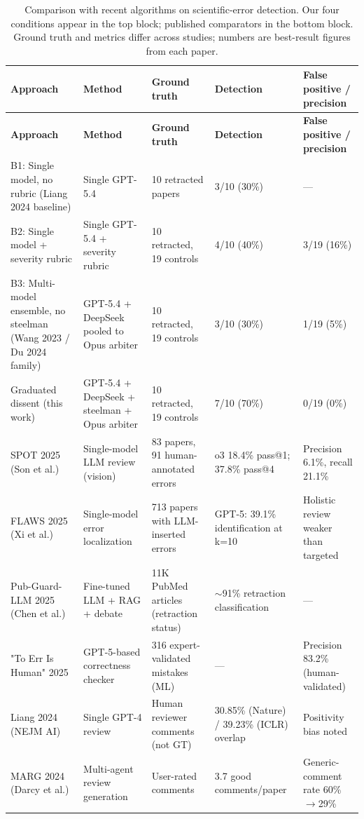 \begin{longtable}{p{4.5cm} p{4cm} p{2.5cm} p{2.5cm} p{2.5cm}}
\caption{Comparison with recent algorithms on scientific-error detection. Our four conditions appear in the top block; published comparators in the bottom block. Ground truth and metrics differ across studies; numbers are best-result figures from each paper.}\label{tab:comparison} \\
\toprule
\textbf{Approach} & \textbf{Method} & \textbf{Ground truth} & \textbf{Detection} & \textbf{False positive / precision} \\
\midrule
\endfirsthead
\toprule
\textbf{Approach} & \textbf{Method} & \textbf{Ground truth} & \textbf{Detection} & \textbf{False positive / precision} \\
\midrule
\endhead
B1: Single model, no rubric (Liang 2024 baseline) & Single GPT-5.4 & 10 retracted papers & 3/10 (30\%) & --- \\
B2: Single model + severity rubric & Single GPT-5.4 + severity rubric & 10 retracted, 19 controls & 4/10 (40\%) & 3/19 (16\%) \\
B3: Multi-model ensemble, no steelman (Wang 2023 / Du 2024 family) & GPT-5.4 + DeepSeek pooled to Opus arbiter & 10 retracted, 19 controls & 3/10 (30\%) & 1/19 (5\%) \\
Graduated dissent (this work) & GPT-5.4 + DeepSeek + steelman + Opus arbiter & 10 retracted, 19 controls & 7/10 (70\%) & 0/19 (0\%) \\
\midrule
SPOT 2025 (Son et al.) & Single-model LLM review (vision) & 83 papers, 91 human-annotated errors & o3 18.4\% pass@1; 37.8\% pass@4 & Precision 6.1\%, recall 21.1\% \\
FLAWS 2025 (Xi et al.) & Single-model error localization & 713 papers with LLM-inserted errors & GPT-5: 39.1\% identification at k=10 & Holistic review weaker than targeted \\
Pub-Guard-LLM 2025 (Chen et al.) & Fine-tuned LLM + RAG + debate & 11K PubMed articles (retraction status) & $\sim$91\% retraction classification & --- \\
"To Err Is Human" 2025 & GPT-5-based correctness checker & 316 expert-validated mistakes (ML) & --- & Precision 83.2\% (human-validated) \\
Liang 2024 (NEJM AI) & Single GPT-4 review & Human reviewer comments (not GT) & 30.85\% (Nature) / 39.23\% (ICLR) overlap & Positivity bias noted \\
MARG 2024 (Darcy et al.) & Multi-agent review generation & User-rated comments & 3.7 good comments/paper & Generic-comment rate 60\%$\rightarrow$29\% \\
\bottomrule
\end{longtable}
